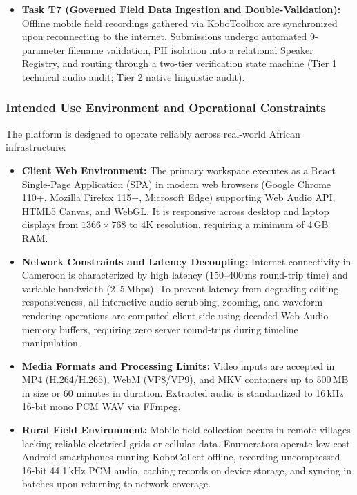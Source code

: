 \documentclass[a4paper,11pt]{article}
\begin{document}
\begin{itemize}
    \item \textbf{Task T7 (Governed Field Data Ingestion and Double-Validation):} Offline mobile field recordings gathered via KoboToolbox are synchronized upon reconnecting to the internet. Submissions undergo automated 9-parameter filename validation, PII isolation into a relational Speaker Registry, and routing through a two-tier verification state machine (Tier 1 technical audio audit; Tier 2 native linguistic audit).
\end{itemize}

\subsubsection{Intended Use Environment and Operational Constraints}
\label{sec:chap3_ucd_environment}
The platform is designed to operate reliably across real-world African infrastructure:
\begin{itemize}
    \item \textbf{Client Web Environment:} The primary workspace executes as a React Single-Page Application (SPA) in modern web browsers (Google Chrome 110+, Mozilla Firefox 115+, Microsoft Edge) supporting Web Audio API, HTML5 Canvas, and WebGL. It is responsive across desktop and laptop displays from $1366\times 768$ to $4$K resolution, requiring a minimum of 4\,GB RAM.
    \item \textbf{Network Constraints and Latency Decoupling:} Internet connectivity in Cameroon is characterized by high latency (150--400\,ms round-trip time) and variable bandwidth (2--5\,Mbps). To prevent latency from degrading editing responsiveness, all interactive audio scrubbing, zooming, and waveform rendering operations are computed client-side using decoded Web Audio memory buffers, requiring zero server round-trips during timeline manipulation.
    \item \textbf{Media Formats and Processing Limits:} Video inputs are accepted in MP4 (H.264/H.265), WebM (VP8/VP9), and MKV containers up to 500\,MB in size or 60 minutes in duration. Extracted audio is standardized to 16\,kHz 16-bit mono PCM WAV via FFmpeg.
    \item \textbf{Rural Field Environment:} Mobile field collection occurs in remote villages lacking reliable electrical grids or cellular data. Enumerators operate low-cost Android smartphones running KoboCollect offline, recording uncompressed 16-bit 44.1\,kHz PCM audio, caching records on device storage, and syncing in batches upon returning to network coverage.
\end{itemize}
\end{document}
